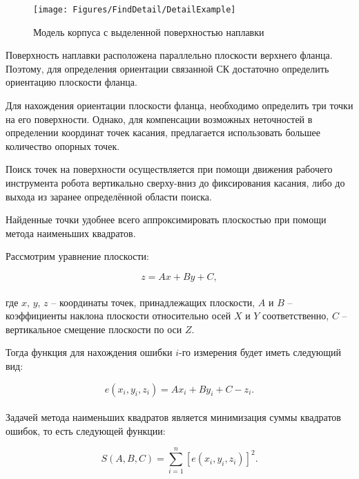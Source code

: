 \begin{figure}[H]
    \centering
    \vspace{14pt}
    \texttt{[image: Figures/FindDetail/DetailExample]}
    \caption{Модель корпуса с выделенной поверхностью наплавки}
    \label{fig:FindTouch:ValveExample}
\end{figure}

Поверхность наплавки расположена параллельно плоскости верхнего фланца.
Поэтому, для определения ориентации связанной СК достаточно определить ориентацию плоскости фланца.

Для нахождения ориентации плоскости фланца, необходимо определить три точки на его поверхности.
Однако, для компенсации возможных неточностей в определении координат точек касания, предлагается использовать большее количество опорных точек.

Поиск точек на поверхности осуществляется при помощи движения рабочего инструмента робота вертикально сверху-вниз до фиксирования касания, либо до выхода из заранее определённой области поиска.

Найденные точки удобнее всего аппроксимировать плоскостью при помощи метода наименьших квадратов.

Рассмотрим уравнение плоскости:

\begin{equation}
    \label{eq:Plane}
    z = A x + B y + C,
\end{equation} \\
где $x$, $y$, $z$ -- координаты точек, принадлежащих плоскости, $A$ и $B$ -- коэффициенты наклона плоскости относительно осей $X$ и $Y$ соответственно, $C$ -- вертикальное смещение плоскости по оси $Z$.

Тогда функция для нахождения ошибки $i$-го измерения будет иметь следующий вид:

\begin{equation}
    \label{eq:Plane_MNK_e}
    e(x_i, y_i, z_i) = A x_i + B y_i + C - z_i.
\end{equation} \\

Задачей метода наименьших квадратов является минимизация суммы квадратов ошибок, то есть следующей функции:

\begin{equation}
    \label{eq:Plane_MNK_S}
    S(A, B, C) = \sum_{i=1}^{n} \left[ e(x_i, y_i, z_i) \right]^2.
\end{equation} \\

